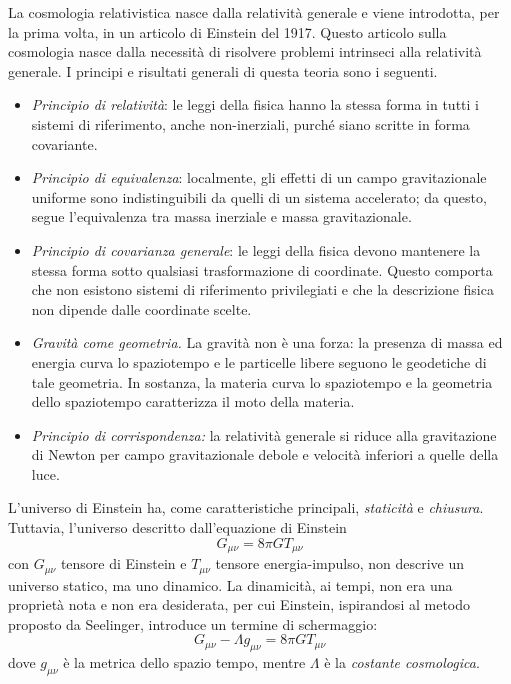 \documentclass[11pt, a4paper]{scrartcl}
\theoremstyle{style}
\theoremstyle{style1}
\numberwithin{equation}{subsection}
\begin{document}
La cosmologia relativistica nasce dalla relativit\`a generale e viene introdotta, per la prima volta, in un articolo di Einstein del 1917.
Questo articolo sulla cosmologia nasce dalla necessit\`a di risolvere problemi intrinseci alla relativit\`a generale. 
I principi e risultati generali di questa teoria sono i seguenti.
\begin{itemize}
	\item \textit{Principio di relativit\`a}: le leggi della fisica hanno la stessa forma in tutti i sistemi di riferimento, anche non-inerziali, purch\'e siano scritte in forma covariante.
	\item \textit{Principio di equivalenza}: localmente, gli effetti di un campo gravitazionale uniforme sono indistinguibili da quelli di un sistema accelerato; da questo, segue l'equivalenza tra massa inerziale e massa gravitazionale.
	\item \textit{Principio di covarianza generale}: le leggi della fisica devono mantenere la stessa forma sotto qualsiasi trasformazione di coordinate.
		Questo comporta che non esistono sistemi di riferimento privilegiati e che la descrizione fisica non dipende dalle coordinate scelte.
	\item \textit{Gravit\`a come geometria.} 
		La gravit\`a non \`e una forza: la presenza di massa ed energia curva lo spaziotempo e le particelle libere seguono le geodetiche di tale geometria.
		In sostanza, la materia curva lo spaziotempo e la geometria dello spaziotempo caratterizza il moto della materia.
	\item \textit{Principio di corrispondenza:} la relativit\`a generale si riduce alla gravitazione di Newton per campo gravitazionale debole e velocit\`a inferiori a quelle della luce.
\end{itemize}
L'universo di Einstein ha, come caratteristiche principali, \textit{staticit\`a} e \textit{chiusura}.
Tuttavia, l'universo descritto dall'equazione di Einstein
\[
G_{\mu \nu }  = 8 \pi G T_{\mu \nu } 
\] 
con $G_{\mu \nu } $ tensore di Einstein e $T_{\mu \nu } $ tensore energia-impulso, non descrive un universo statico, ma uno dinamico.
La dinamicit\`a, ai tempi, non era una propriet\`a nota e non era desiderata, per cui Einstein, ispirandosi al metodo proposto da Seelinger, introduce un termine di schermaggio:
\[
G_{\mu \nu }  - \Lambda g_{\mu \nu }  = 8 \pi G T_{\mu  \nu } 
\] 
dove $g_{\mu \nu } $ \`e la metrica dello spazio tempo, mentre $\Lambda $ \`e la \textit{costante cosmologica}.
\end{document}
